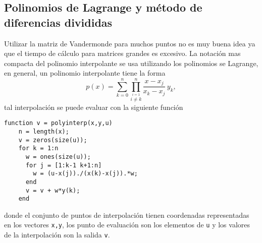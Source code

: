 \documentclass[12pt,letterpaper]{article}
\begin{document}
\subsection{Polinomios de Lagrange y m\'etodo de diferencias divididas}

Utilizar la matriz de Vandermonde para muchos puntos no es muy buena idea ya que el tiempo de c\'alculo para matrices grandes 
es excesivo. La notaci\'on mas compacta del polinomio interpolante se usa utilizando los polinomios se Lagrange, en general, 
un polinomio interpolante tiene la forma
$$\displaystyle
p(x)=\sum_{k=0}^{n} \prod_{\stackrel{i=1}{i\neq k}}^n \frac{x-x_j}{x_k-x_j} \, y_k,
$$
tal interpolaci\'on se puede evaluar con la siguiente funci\'on
\begin{verbatim}
function v = polyinterp(x,y,u)
    n = length(x);
    v = zeros(size(u));
    for k = 1:n
      w = ones(size(u));
      for j = [1:k-1 k+1:n]
      	w = (u-x(j))./(x(k)-x(j)).*w;
      end
      v = v + w*y(k);
    end
\end{verbatim}
donde el conjunto de puntos de interpolaci\'on tienen coordenadas representadas en los vectores \texttt{x,y}, los punto de evaluaci\'on son los elementos de \texttt{u} y los valores de la interpolaci\'on son la salida \texttt{v}.
\end{document}
